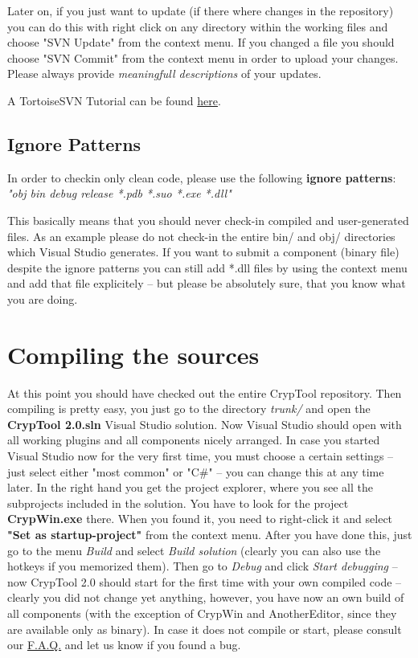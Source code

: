 Later on, if you just want to update (if there where changes in the repository) you can do this with right click on any directory within the working files and choose "SVN Update" from the context menu. If you changed a file you should choose "SVN Commit" from the context menu in order to upload your changes. Please always provide \textit{meaningfull descriptions} of your updates.

A TortoiseSVN Tutorial can be found \href{http://www.mind.ilstu.edu/research/robots/iris4/developers/svntutorial}{here}.

\subsection*{Ignore Patterns}

In order to checkin only clean code, please use the following \textbf{ignore patterns}: \textit{"obj bin debug release *.pdb *.suo *.exe *.dll"}

This basically means that you should never check-in compiled and user-generated files. As an example please do not check-in the entire bin/ and obj/ directories which Visual Studio generates. If you want to submit a component (binary file) despite the ignore patterns you can still add *.dll files by using the context menu and add that file explicitely -- but please be absolutely sure, that you know what you are doing.

\section{Compiling the sources}

At this point you should have checked out the entire CrypTool repository. Then compiling is pretty easy, you just go to the directory \textit{trunk/} and open the \textbf{CrypTool 2.0.sln} Visual Studio solution. Now Visual Studio should open with all working plugins and all components nicely arranged. In case you started Visual Studio now for the very first time, you must choose a certain settings -- just select either "most common" or "C\#" -- you can change this at any time later. In the right hand you get the project explorer, where you see all the subprojects included in the solution. You have to look for the project \textbf{CrypWin.exe} there. When you found it, you need to right-click it and select \textbf{"Set as startup-project"} from the context menu. After you have done this, just go to the menu \textit{Build} and select \textit{Build solution} (clearly you can also use the hotkeys if you memorized them). Then go to \textit{Debug} and click \textit{Start debugging} -- now CrypTool 2.0 should start for the first time with your own compiled code -- clearly you did not change yet anything, however, you have now an own build of all components (with the exception of CrypWin and AnotherEditor, since they are available only as binary). In case it does not compile or start, please consult our \href{https://www.cryptool.org/trac/CrypTool2/wiki/FAQ}{F.A.Q.} and let us know if you found a bug.

